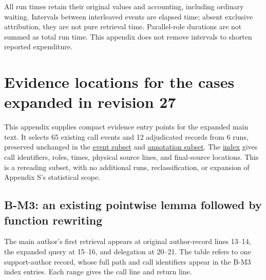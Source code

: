 All run times retain their original values and accounting, including ordinary waiting. Intervals between interleaved events are elapsed time; absent exclusive attribution, they are not pure retrieval time. Parallel-role durations are not summed as total run time. This appendix does not remove intervals to shorten reported expenditure.

\section[Evidence locations for the cases expanded in revision 27]{\texorpdfstring{\protect\hypertarget{appendix-t}{}Evidence locations for the cases expanded in revision 27}{Evidence locations for the cases expanded in revision 27}}
This appendix supplies compact evidence entry points for the expanded main text. It selects 65 existing call events and 12 adjudicated records from 6 runs, preserved unchanged in the \href{verification/revision27/expanded_case_events.jsonl}{event subset} and \href{verification/revision27/expanded_case_annotations.json}{annotation subset}. The \href{verification/revision27/expanded_case_index.json}{index} gives call identifiers, roles, times, physical source lines, and final-source locations. This is a rereading subset, with no additional runs, reclassification, or expansion of Appendix S's statistical scope.

\subsection[B-M3: an existing pointwise lemma followed by function rewriting]{\texorpdfstring{\protect\hypertarget{t1}{}B-M3: an existing pointwise lemma followed by function rewriting}{B-M3: an existing pointwise lemma followed by function rewriting}}
The main author's first retrieval appears at original author-record lines 13–14, the expanded query at 15–16, and delegation at 20–21. The table refers to one support-author record, whose full path and call identifiers appear in the B-M3 index entries. Each range gives the call line and return line.

